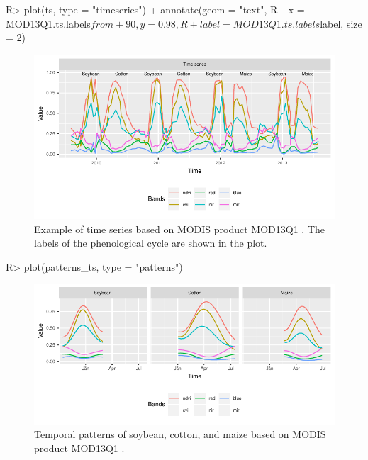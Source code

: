 \documentclass[article,shortnames]{jss}
\begin{document}
\begin{CodeChunk}

\begin{CodeInput}
R> plot(ts, type = "timeseries") + annotate(geom = "text", 
R+   x = MOD13Q1.ts.labels$from + 90, y = 0.98, 
R+   label = MOD13Q1.ts.labels$label, size = 2)
\end{CodeInput}
\begin{figure}[!h]

{\centering \includegraphics{dtwSat_files/figure-latex/example-timeseries-1} 

}

\caption{Example of time series based on MODIS product MOD13Q1 \citep{Friedl:2010}. The labels of the phenological cycle are shown in the plot.}\label{fig:example-timeseries}
\end{figure}
\end{CodeChunk}

\begin{CodeChunk}

\begin{CodeInput}
R> plot(patterns_ts, type = "patterns")
\end{CodeInput}
\begin{figure}[!h]

{\centering \includegraphics{dtwSat_files/figure-latex/temporal-patterns-soy-cot-mai-1} 

}

\caption{Temporal patterns of soybean, cotton, and maize based on MODIS product MOD13Q1 \citep{Friedl:2010}.}\label{fig:temporal-patterns-soy-cot-mai}
\end{figure}
\end{CodeChunk}
\end{document}
